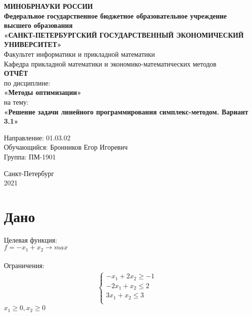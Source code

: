 \documentclass[14pt,a4paper,fleqn]{extarticle}
\begin{document}
\begin{titlepage}
	\begin{center}
		\vspace*{1cm}
		\textbf{МИНОБРНАУКИ РОССИИ}\\
		\vspace{0.2cm}
		\textbf{Федеральное государственное бюджетное образовательное учреждение высшего образования}\\
		\textbf{«САНКТ-ПЕТЕРБУРГСКИЙ ГОСУДАРСТВЕННЫЙ ЭКОНОМИЧЕСКИЙ УНИВЕРСИТЕТ»}\\
		\vspace{0.6cm}
		Факультет информатики и прикладной математики\\
		Кафедра прикладной математики и экономико-математических методов\\
		\vspace{1cm}
		\textbf{ОТЧЁТ}\\
		по дисциплине:\\
		\textbf{«Методы оптимизации»}\\
		на тему:\\
		\textbf{«Решение задачи линейного программирования симплекс-методом. Вариант 3.1»}\\
	\end{center}
	\vspace{1cm}
	Направление: 01.03.02\\
	Обучающийся: Бронников Егор Игоревич\\
	Группа: ПМ-1901\\
	\vfill
	\begin{center}
		Санкт-Петербург\\
		2021\\
	\end{center}
\end{titlepage}

\section*{Дано}
Целевая функция:\\
$f = -x_1+x_2 \longrightarrow max$\\\\
Ограничения:
\begin{align*}
	\begin{cases}
		-x_1 + 2x_2 \geq -1\\
		-2x_1 + x_2 \leq 2\\
		3x_1 + x_2 \leq 3\\
	\end{cases}
\end{align*}
$x_1 \geq 0, x_2 \geq 0$
\end{document}
